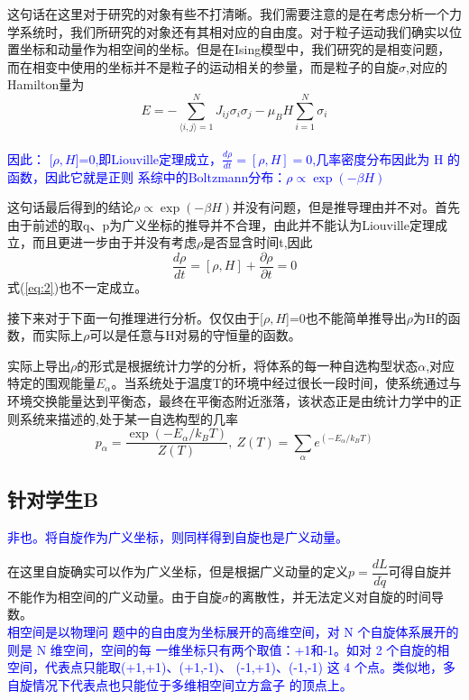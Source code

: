 \documentclass{article}
\begin{document}
这句话在这里对于研究的对象有些不打清晰。我们需要注意的是在考虑分析一个力学系统时，我们所研究的对象还有其相对应的自由度。对于粒子运动我们确实以位置坐标和动量作为相空间的坐标。但是在Ising模型中，我们研究的是相变问题，而在相变中使用的坐标并不是粒子的运动相关的参量，而是粒子的自旋$\sigma$,对应的Hamilton量为
\begin{equation}
	E=-\sum_{\langle i,j\rangle=1}^{N}J_{ij}\sigma_i\sigma_j-\mu_BH\sum_{i=1}^{N}\sigma_i
\end{equation}\\


\textcolor{blue}{因此： [$ \rho,H $]=0,即Liouville定理成立，$ \frac{d\rho}{dt}=[\rho,H]=0 $,几率密度分布因此为 H 的函数，因此它就是正则
	系综中的Boltzmann分布：$ \rho\propto\exp(-\beta H) $}


这句话最后得到的结论$ \rho\propto\exp(-\beta H) $并没有问题，但是推导理由并不对。首先由于前述的取q、p为广义坐标的推导并不合理，由此并不能认为Liouville定理成立，而且更进一步由于并没有考虑$\rho$是否显含时间t,因此
\begin{equation}
	\frac{d\rho}{dt}=[\rho,H]+\frac{\partial\rho}{\partial t}=0
	\label{eq:2}
\end{equation}
式(\ref{eq:2})也不一定成立。


接下来对于下面一句推理进行分析。仅仅由于[$ \rho,H $]=0也不能简单推导出$\rho$为H的函数，而实际上$\rho$可以是任意与H对易的守恒量的函数。


实际上导出$\rho$的形式是根据统计力学的分析，将体系的每一种自选构型状态$\alpha$,对应特定的围观能量$ E_{\alpha} $。当系统处于温度T的环境中经过很长一段时间，使系统通过与环境交换能量达到平衡态，最终在平衡态附近涨落，该状态正是由统计力学中的正则系统来描述的,处于某一自选构型的几率
\begin{equation}
	p_{\alpha}=\frac{\exp(-E_{\alpha}/k_BT)}{Z(T)},\ Z(T)=\sum_{\alpha}e^{(-E_{\alpha}/k_BT)}
\end{equation}

\subsection{针对学生B}
\textcolor{blue}{非也。将自旋作为广义坐标，则同样得到自旋也是广义动量。}


在这里自旋确实可以作为广义坐标，但是根据广义动量的定义$ p=\dfrac{dL}{d\dot{q}} $可得自旋并不能作为相空间的广义动量。由于自旋$ \sigma $的离散性，并无法定义对自旋的时间导数。\\


\textcolor{blue}{相空间是以物理问
	题中的自由度为坐标展开的高维空间，对 N 个自旋体系展开的则是 N 维空间，空间的每
	一维坐标只有两个取值：+1和-1。如对 2 个自旋的相空间，代表点只能取(+1,+1)、(+1,-1)、
	(-1,+1)、(-1,-1) 这 4 个点。类似地，多自旋情况下代表点也只能位于多维相空间立方盒子
	的顶点上。}
\end{document}
